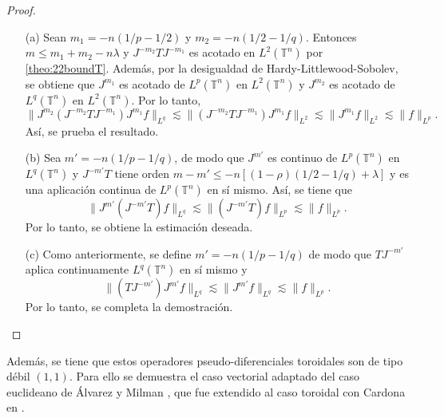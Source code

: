 \begin{proof}
	\begin{itemize}
		\item[(a)] Sean $m_1 = -n(1/p - 1/2)$ y $m_2=-n(1/2 - 1/q)$. Entonces $m\leq m_1+m_2-n\lambda$ y $J^{-m_2}TJ^{-m_1}$ es acotado en $L^2(\mathbb{T}^n)$ por \cref{theo:22boundT}. Además, por la desigualdad de Hardy-Littlewood-Sobolev, se obtiene que $J^{m_1}$ es acotado de $L^p(\mathbb{T}^n)$ en $L^2(\mathbb{T}^n)$ y $J^{m_2}$ es acotado de $L^q(\mathbb{T}^n)$ en $L^2(\mathbb{T}^n)$. Por lo tanto, 
		\begin{equation*}
			\| J^{m_2}(J^{-m_2}TJ^{-m_1})J^{m_1}f \|_{L^q} \lesssim \|(J^{-m_2}TJ^{-m_1})J^{m_1}f  \|_{L^2} \lesssim \| J^{m_1}f \|_{L^2} \lesssim  \| f\|_{L^p}.
		\end{equation*}
		Así, se prueba el resultado.\\
		
		\item[(b)] Sea $m' = -n(1/p - 1/q)$, de modo que $J^{m'}$ es continuo de  $L^p(\mathbb{T}^n)$ en $L^q(\mathbb{T}^n)$ y $J^{-m'}T$ tiene orden $m-m' \leq -n[(1-\rho)(1/2 - 1/q) + \lambda]$ y es una aplicación continua de $L^p(\mathbb{T}^n)$ en sí mismo. Así, se tiene que
		\begin{equation*}
			\| J^{m'}(J^{-m'}T)f \|_{L^q} \lesssim \|(J^{-m'}T)f\|_{L^p} \lesssim \|f\|_{L^p}.
		\end{equation*}
		Por lo tanto, se obtiene la estimación deseada.\\
		
		\item[(c)] Como anteriormente, se define  $m' = -n(1/p - 1/q)$ de modo que $TJ^{-m'}$ aplica continuamente  $L^q(\mathbb{T}^n)$ en sí mismo y
		\begin{equation*}
			\|(TJ^{-m'})J^{m'}f\|_{L^q} \lesssim \|J^{m'}f\|_{L^q} \lesssim \|f\|_{L^p}.
		\end{equation*}
		Por lo tanto, se completa la demostración.
	\end{itemize}
\end{proof}
Además, se tiene que estos operadores pseudo-diferenciales toroidales son de tipo débil $(1,1)$. Para ello se demuestra el caso vectorial adaptado del caso euclideano de Álvarez y Milman \cite{alvarez-milman}, que fue extendido al caso toroidal con Cardona en \cite{Cardona:Martinez}.
